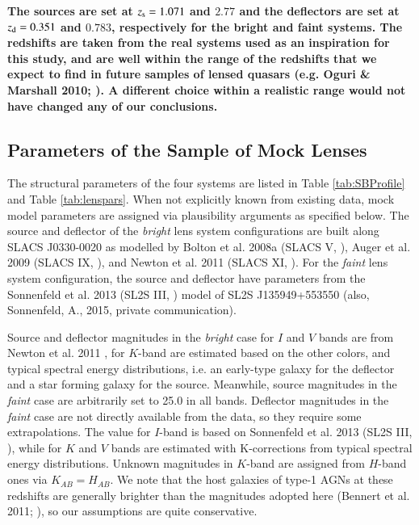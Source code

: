 \documentclass[a4paper,11pt]{article}
\begin{document}
{\bf The sources are set at $z_{\rm s} = 1.071$ and $2.77$ and the
deflectors are set at $z_{\rm d} = 0.351$ and $0.783$, respectively
for the bright and faint systems. The redshifts are taken from the
real systems used as an inspiration for this study, and are well
within the range of the redshifts that we expect to find in future
samples of lensed quasars (e.g. Oguri \& Marshall 2010;
\cite{2010MNRAS.405.2579O}). A different choice within a realistic
range would not have changed any of our conclusions.}


\subsection{Parameters of the Sample of Mock Lenses}

The structural parameters of the four systems are listed in Table
\ref{tab:SBProfile} and Table \ref{tab:lenspars}. When not explicitly known from existing data,
mock model parameters are assigned via plausibility arguments as
specified below. The source and deflector of the \textit{bright} lens
system configurations are built along SLACS J0330-0020 as modelled by
Bolton et al. 2008a (SLACS V, \cite{2008ApJ...682..964B}), Auger et
al. 2009 (SLACS IX, \cite{2009ApJ...705.1099A}), and Newton et
al. 2011 (SLACS XI, \cite{2011ApJ...734..104N}). For the
\textit{faint} lens system configuration, the source and deflector
have parameters from the Sonnenfeld et al. 2013 (SL2S III,
\cite{2013ApJ...777...97S}) model of SL2S J135949+553550
(also, Sonnenfeld, A., 2015, private communication).

Source and deflector magnitudes in the \textit{bright} case for $I$ and
$V$ bands are from Newton et al. 2011 \cite{2011ApJ...734..104N}, for
$K$-band are estimated based on the other colors, and typical spectral
energy distributions, i.e. an early-type galaxy for the deflector and
a star forming galaxy for the source. Meanwhile, source magnitudes in
the \textit{faint} case are arbitrarily set to 25.0 in all
bands. Deflector magnitudes in the \textit{faint} case are not
directly available from the data, so they require some
extrapolations. The value for $I$-band is based on Sonnenfeld et
al. 2013 (SL2S III,
\cite{2013ApJ...777...97S}), while for $K$ and $V$ bands are estimated
with K-corrections from typical spectral energy distributions. Unknown
magnitudes in $K$-band are assigned from $H$-band ones via
$K_{AB}=H_{AB}$. We note that the host galaxies of type-1 AGNs at
these redshifts are generally brighter than the magnitudes adopted
here (Bennert et al. 2011; \cite{2011ApJ...742..107B}), so our
assumptions are quite conservative.
\end{document}
